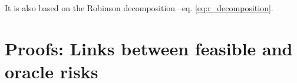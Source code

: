 \documentclass[11pt]{article}
\let\cite=\supercite
\newtheorem{definition}{Definition}
\newtheorem{lemma}{Lemma}
\begin{document}
It is also based on the Robinson decomposition --eq. \ref{eq:r_decomposition}. %

\section{Proofs: Links between feasible and oracle risks}\label{apd:proofs}






\end{document}
